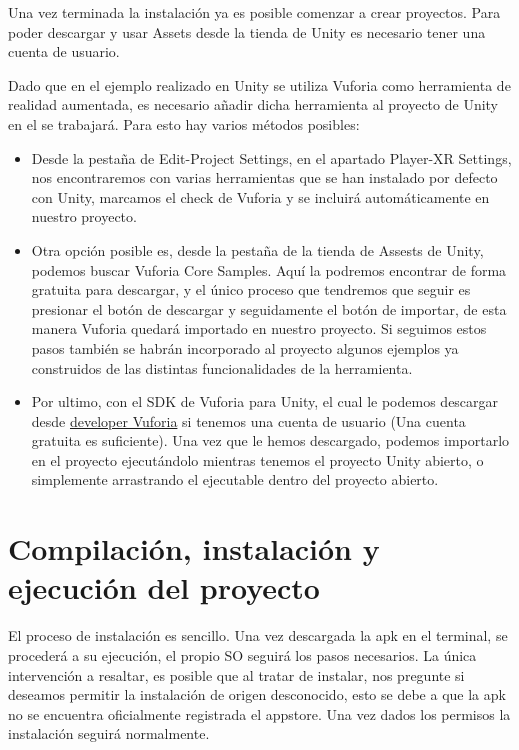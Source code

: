 Una vez terminada la instalación ya es posible comenzar a crear proyectos. 
Para poder descargar y usar Assets desde la tienda de Unity es necesario tener una cuenta de usuario.

Dado que en el ejemplo realizado en Unity se utiliza Vuforia como herramienta de realidad aumentada, es necesario añadir dicha herramienta al proyecto de Unity en el se trabajará. Para esto hay varios métodos posibles:
\begin{itemize}
\item Desde la pestaña de Edit-Project Settings, en el apartado Player-XR Settings, nos encontraremos con varias herramientas que se han instalado por defecto con Unity, marcamos el check de Vuforia y se incluirá automáticamente en nuestro proyecto.

\item Otra opción posible es, desde la pestaña de la tienda de Assests de Unity, podemos buscar Vuforia Core Samples. Aquí la podremos encontrar de forma gratuita para descargar, y el único proceso que tendremos que seguir es presionar el botón de descargar y seguidamente el botón de importar, de esta manera Vuforia quedará importado en nuestro proyecto. Si seguimos estos pasos también se habrán incorporado al proyecto algunos ejemplos ya construidos de las distintas funcionalidades de la herramienta.

\item Por ultimo, con el SDK de Vuforia para Unity, el cual le podemos descargar desde \href{https://developer.vuforia.com/downloads/sdk}{developer Vuforia} si tenemos una cuenta de usuario (Una cuenta gratuita es suficiente). Una vez que le hemos descargado, podemos importarlo en el proyecto ejecutándolo mientras tenemos el proyecto Unity abierto, o simplemente arrastrando el ejecutable dentro del proyecto abierto.	
\end{itemize}


\section{Compilación, instalación y ejecución del proyecto}

El proceso de instalación es sencillo. Una vez descargada la apk en el terminal, se procederá a su ejecución, el propio SO seguirá los pasos necesarios. La única intervención a resaltar, es posible que al tratar de instalar, nos pregunte si deseamos permitir la instalación de origen desconocido, esto se debe a que la apk no se encuentra oficialmente registrada el appstore. Una vez dados los permisos la instalación seguirá normalmente.

